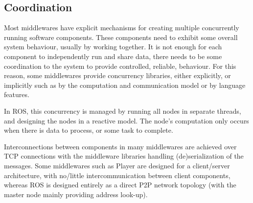 \documentclass[../dissertation.tex]{subfiles}
\begin{document}
\subsection{Coordination}

Most middlewares have explicit mechanisms for creating multiple concurrently running software components. These components need to exhibit some overall system behaviour, usually by working together. It is not enough for each component to independently run and share data, there needs to be some coordination to the system to provide controlled, reliable, behaviour. For this reason, some middlewares provide concurrency libraries, either explicitly, or implicitly such as by the computation and communication model or by language features.

In ROS, this concurrency is managed by running all nodes in separate threads, and designing the nodes in a reactive model. The node's computation only occurs when there is data to process, or some task to complete.

Interconnections between components in many middlewares are achieved over TCP connections with the middleware libraries handling (de)serialization of the messages. Some middlewares such as Player are designed for a client/server architecture, with no/little intercommunication between client components, whereas ROS is designed entirely as a direct P2P network topology (with the master node mainly providing address look-up).
\end{document}
